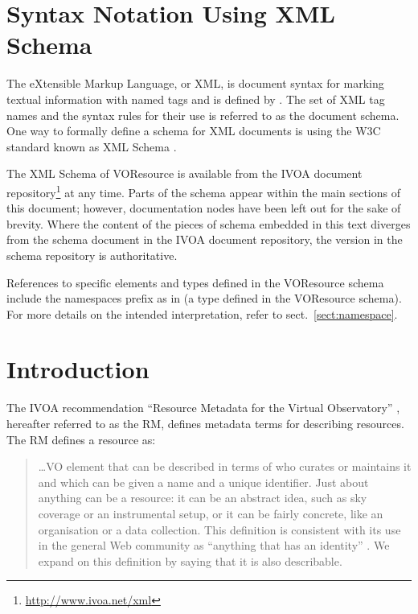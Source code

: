 \documentclass[11pt,a4paper]{ivoa}
\begin{document}
\section*{Syntax Notation Using XML Schema}

The eXtensible Markup Language, or XML, is document syntax for marking
textual information with named tags and is defined by \citet{std:XML}.
The set of XML tag names and the syntax
rules for their use is referred to as the document schema.  One way to
formally define a schema for XML documents is using the W3C standard
known as XML Schema \citep{std:XSD}.

The XML Schema of VOResource is
available from the IVOA document
repository\footnote{\url{http://www.ivoa.net/xml}} at any time.
Parts of the schema appear within the main sections of this document;
however, documentation nodes have been left out for the sake of brevity.
Where the content of the pieces of schema embedded in this text
diverges from the schema document in the IVOA document
repository, the version in the schema repository is authoritative.

References to specific elements and types defined in the VOResource
schema include the namespaces prefix  as in
 (a type defined in the VOResource schema).  For more
details on the intended interpretation, refer to
sect.~\ref{sect:namespace}.

\section{Introduction}

The IVOA recommendation ``Resource Metadata for the Virtual
Observatory''
\citep{2007ivoa.spec.0302H}, hereafter referred to as the RM, defines
metadata terms for describing resources.  The RM defines a resource as:

\begin{quotation}
\dots VO element that can be described in terms of who curates or
maintains it and which can be given a name and a unique identifier.
Just about anything can be a resource: it can be an abstract idea,
such as sky coverage or an instrumental setup, or it can be fairly
concrete, like an organisation or a data collection.  This definition
is consistent with its use in the general Web community as
``anything that has an identity'' \citep{std:RFC3986}.  We
expand on this definition by saying that it is also describable.
\end{quotation}
\end{document}
